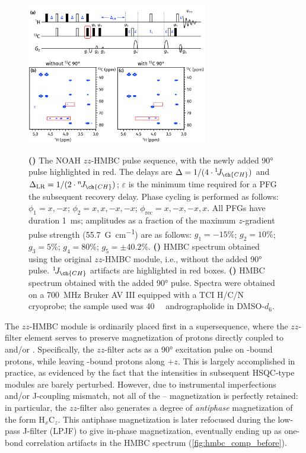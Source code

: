\documentclass[a4paper,11pt]{article}
\newcommand{\proton}{\ch{^{1}H}}
\newcommand{\carbonbulk}{\ch{^{12}C}}
\newcommand{\carbon}{\ch{^{13}C}}
\newcommand{\nitrogen}{\ch{^{15}N}}
\newcommand{\CH}{\carbon{}--\proton{}}
\newcommand{\onejch}{{}^1\!J_{\ch{CH}}}
\newcommand{\njch}{{}^n\!J_{\ch{CH}}}
\newcommand*{\andro}{Spectra were obtained on a \SI{700}{\MHz} Bruker AV III equipped with a TCI H/C/N cryoprobe; the sample used was \SI{40}{\milli\molar} andrographolide in DMSO-\(d_6\).}
\begin{document}
\begin{refsection}
\begin{figure}[ht]
    \centering
    \includegraphics[width=0.7\textwidth]{hmbc_comp.png}
    {\label{fig:hmbc_comp_pulprog}}
    {\label{fig:hmbc_comp_before}}
    {\label{fig:hmbc_comp_after}}
    \caption{
        \textbf{()} The NOAH \(zz\)-HMBC pulse sequence, with the newly added \carbon{} \ang{90} pulse highlighted in red.
        The delays are \(\Delta = 1/(4 \cdot \onejch)\) and \(\Delta_{\text{LR}} = 1/(2 \cdot \njch)\); \(\varepsilon\) is the minimum time required for a PFG the subsequent recovery delay.
        Phase cycling is performed as follows: \(\phi_1 = x, -x\); \(\phi_2 = x, x, -x, -x\); \(\phi_{\text{rec}} = x, -x, -x, x\).
        All PFGs have duration \SI{1}{ms}; amplitudes as a fraction of the maximum \(z\)-gradient pulse strength (\SI{55.7}{G\per\cm}) are as follows: \(g_1 = -15\%\); \(g_2 = 10\%\); \(g_3 = 5\%\); \(g_4 = 80\%\); \(g_5 = \pm 40.2\%\).
        \textbf{()} HMBC spectrum obtained using the original \(zz\)-HMBC module, i.e., without the added \ang{90} pulse.
        \(\onejch{}\) artifacts are highlighted in red boxes.
        \textbf{()} HMBC spectrum obtained with the added \ang{90} pulse.
        \andro{}
    }
    \label{fig:hmbc_comp}
\end{figure}

The \(zz\)-HMBC module is ordinarily placed first in a supersequence, where the \(zz\)-filter element serves to preserve magnetization of protons directly coupled to \carbon{} and/or \nitrogen{}.\autocite{Kupce2018CC,Kupce2019JMR}
Specifically, the \(zz\)-filter acts as a \ang{90} excitation pulse on \carbonbulk{}-bound protons, while leaving \carbon{}-bound protons along \(+z\).
This is largely accomplished in practice, as evidenced by the fact that the intensities in subsequent HSQC-type modules are barely perturbed.
However, due to instrumental imperfections and/or J-coupling mismatch, not all of the \CH{} magnetization is perfectly retained: in particular, the \(zz\)-filter also generates a degree of \textit{antiphase} magnetization of the form \(\mathrm{H}_x\mathrm{C}_z\).
This antiphase magnetization is later refocused during the low-pass J-filter (LPJF) to give in-phase magnetization, eventually ending up as one-bond correlation artifacts in the HMBC spectrum (\cref{fig:hmbc_comp_before}).


\end{refsection}
\end{document}
